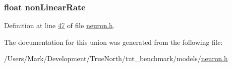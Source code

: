 \subsubsection[{non\+Linear\+Rate}]{\setlength{\rightskip}{0pt plus 5cm}float non\+Linear\+Rate}\label{union_reset_rate_a54aaba14ce85fd9c5d7b385d98727e36}


Definition at line \hyperlink{neuron_8h_source_l00047}{47} of file \hyperlink{neuron_8h_source}{neuron.\+h}.



The documentation for this union was generated from the following file\+:\begin{DoxyCompactItemize}
\item 
/\+Users/\+Mark/\+Development/\+True\+North/tnt\+\_\+benchmark/models/\hyperlink{neuron_8h}{neuron.\+h}\end{DoxyCompactItemize}
